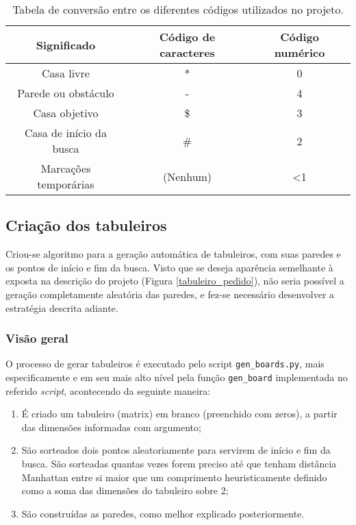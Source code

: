 \documentclass{article}
\begin{document}
\begin{table}[h!]
	\label{codigo}
	\centering
	\begin{tabular}{c|c|c}
		Significado & Código de caracteres & Código numérico\\
		\hline
		Casa livre & * & 0\\
		Parede ou obstáculo & - & 4\\
		Casa objetivo & \$ & 3\\
		Casa de início da busca & \# & 2\\
		Marcações temporárias & (Nenhum) & \textless 1

	\end{tabular}
	\caption{Tabela de conversão entre os diferentes códigos utilizados no projeto.}
\end{table}

\subsection{Criação dos tabuleiros}
Criou-se algoritmo para a geração automática de tabuleiros, com suas paredes e os pontos de início e fim da busca. Visto que se deseja aparência semelhante à exposta na descrição do projeto (Figura \ref{tabuleiro_pedido}), não seria possível a geração completamente aleatória das paredes, e fez-se necessário desenvolver a estratégia descrita adiante.

\subsubsection{Visão geral}
 O processo de gerar tabuleiros é executado pelo script \texttt{gen\_boards.py}, mais especificamente e em seu mais alto nível pela função \verb|gen_board| implementada no referido \emph{script}, acontecendo da seguinte maneira:

\begin{enumerate}
	\item É criado um tabuleiro (matrix) em branco (preenchido com zeros), a partir das dimensões informadas com argumento;
	\item São sorteados dois pontos aleatoriamente para servirem de início e fim da busca. São sorteadas quantas vezes forem preciso até que tenham distância Manhattan entre si maior que um comprimento heuristicamente definido como a soma das dimensões do tabuleiro sobre 2;
	\item São construídas as paredes, como melhor explicado posteriormente.
\end{enumerate}
\end{document}
